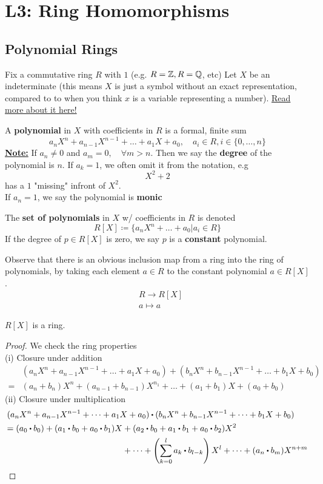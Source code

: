 \documentclass[../Main.tex]{subfiles}
\begin{document}
	\chapter{L3: Ring Homomorphisms}
	\section*{Polynomial Rings}
	Fix a commutative ring $R$ with $1$ (e.g. $R=\mathbb{Z}, R=\mathbb{Q}$, etc)
	Let $X$ be an indeterminate (this means $X$ is just a symbol without an exact representation, compared to to when you think $x$ is a variable representing a number). \href{https://en.wikipedia.org/wiki/Indeterminate_(variable)}{Read more about it here!}
	\begin{dfn}[title = Polynomial in a ring]
		A \textbf{polynomial} in $X$ with coefficients in $R$ is a formal, finite sum
		\[a_nX^n+a_{n-1}X^{n-1}+\dots+a_1X+a_0, \quad a_i\in R, i\in \{0, \dots, n\}\]
		\textbf{\underline{Note:}} If $a_n\ne 0$ and $a_m=0, \quad \forall m>n$. Then we say the \textbf{degree} of the polynomial is $n$.
		If $a_k=1$, we often omit it from the notation, e.g
		\[X^2+2\]
		has a $1$ "missing" infront of $X^2$.\\
		If $a_n=1$, we say the polynomial is \textbf{monic} 
	\end{dfn}
	\begin{dfn}[title=Ring of Polynomials and Constant Polynomial]
		The \textbf{set of polynomials} in $X$ w/ coefficients in $R$ is denoted
		\[R[X] \coloneqq \{a_nX^n+\dots+a_0|a_i \in R\} \]
		If the degree of $p\in R[X]$ is zero, we say $p$ is a \textbf{constant} polynomial.
	\end{dfn}
	Observe that there is an obvious inclusion map from a ring into the ring of polynomials, by taking each element $a\in R$ to the constant polynomial $a\in R[X]$.
	\begin{align*}
		&R \to R[X]\\
		&a\mapsto a
	\end{align*}
	\begin{claim}
		$R[X]$ is a ring.
	\end{claim}
	\begin{proof}We check the ring properties \\
		(i) Closure under addition
		\begin{align*}
		&(a_nX^n+a_{n-1}X^{n-1}+\dots+ a_1X+a_0) + (b_nX^n+b_{n-1}X^{n-1}+\dots+b_1X+b_0) \\
		=& (a_n+b_n)X^n +(a_{n-1}+b_{n-1})X^{n_1}+\dots+(a_1+b_1)X+(a_0+b_0)
		\end{align*}
		(ii) Closure under multiplication
		\begin{align*}
			&(a_nX^n+a_{n-1}X^{n-1}+\dots+ a_1X+a_0) \rdot (b_nX^n+b_{n-1}X^{n-1}+\dots+b_1X+b_0) \\
			& \begin{aligned}=(a_0\rdot b_0)+(a_1\rdot b_0+a_0\rdot b_1)X &+ (a_2\rdot b_0 + a_1\rdot b_1+a_0\rdot b_2)X^2\\
			&+\dots+\left(\sum_{k=0}^{l}a_k\rdot b_{l-k}\right) X^l + \dots + (a_n\rdot b_m)X^{n+m} \qedhere
			\end{aligned}
		\end{align*}
	\end{proof}
\end{document}
